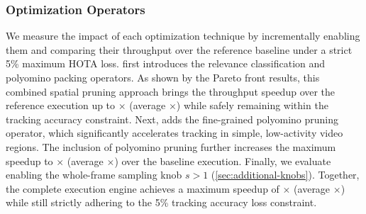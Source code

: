 \subsubsection{Optimization Operators}
We measure the impact of each optimization technique by incrementally enabling them and comparing their throughput over the reference baseline under a strict 5\% maximum HOTA loss.
\sys{} first introduces the relevance classification and polyomino packing operators.
As shown by the Pareto front results,
this combined spatial pruning approach brings the throughput speedup over the reference execution up to \ablationOneSpeedupMax{}$\times$
(average \ablationOneSpeedupAvg{}$\times$)
while safely remaining within the tracking accuracy constraint.
Next, \sys{} adds the fine-grained polyomino pruning operator, which significantly accelerates tracking in simple, low-activity video regions.
The inclusion of polyomino pruning further increases the maximum speedup to \ablationTwoSpeedupMax{}$\times$
(average \ablationTwoSpeedupAvg{}$\times$)
over the baseline execution.
Finally, we evaluate enabling the whole-frame sampling knob $s > 1$ (\autoref{sec:additional-knobs}).
Together,
the complete execution engine achieves a maximum speedup of \ablationThreeSpeedupMax{}$\times$
(average \ablationThreeSpeedupAvg{}$\times$)
while still strictly adhering to the 5\% tracking accuracy loss constraint.

